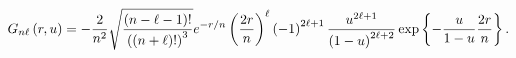\begin{equation}
G_{n\ell }\left( r,u\right) =-\frac{2}{n^{2}}\sqrt{\frac{\left( n-\ell
-1\right) !}{\left( \left( n+\ell \right) !\right) ^{3}}}e^{-r/n}\left( 
\frac{2r}{n}\right) ^{\ell }\left( -1\right) ^{2\ell +1}\frac{u^{2\ell +1}}{%
\left( 1-u\right) ^{2\ell +2}}\exp \left\{ -\frac{u}{1-u}\frac{2r}{n}%
\right\} .
\end{equation}

